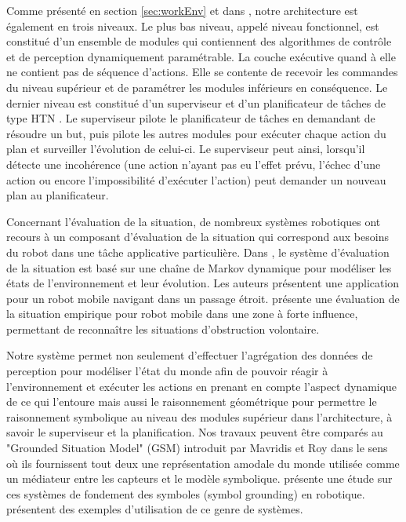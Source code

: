 \documentclass[a4paper,11pt,twoside]{StyleThese}
\begin{document}
Comme présenté en section \ref{sec:workEnv} et dans \cite{Alami1998}, notre architecture est également en trois niveaux. Le plus bas niveau, appelé niveau fonctionnel, est constitué d'un ensemble de modules qui contiennent des algorithmes de contrôle et de perception dynamiquement paramétrable.
La couche exécutive quand à elle ne contient pas de séquence d'actions. Elle se contente de recevoir les commandes du niveau supérieur et de paramétrer les modules inférieurs en conséquence. Le dernier niveau est constitué d'un superviseur \cite{fioreiser2014} et d'un planificateur de tâches de type HTN \cite{Guitton2012}. Le superviseur pilote le planificateur de tâches en demandant de résoudre un but, puis pilote les autres modules pour exécuter chaque action du plan et surveiller l'évolution de celui-ci.
Le superviseur peut ainsi, lorsqu'il détecte une incohérence (une action n'ayant pas eu l'effet prévu, l'échec d'une action ou encore l'impossibilité d'exécuter l'action) peut demander un nouveau plan au planificateur. 


Concernant l'évaluation de la situation, de nombreux systèmes robotiques ont recours à un composant d'évaluation de la situation qui correspond aux besoins du robot dans une tâche applicative particulière. Dans \cite{beck2011}, le système d'évaluation de la situation est basé sur une chaîne de Markov dynamique pour modéliser les états de l'environnement et leur évolution. Les auteurs présentent une application pour un robot mobile navigant dans un passage étroit.
\cite{Kluge01situationassessment} présente une évaluation de la situation empirique pour robot mobile dans une zone à forte influence, permettant de reconnaître les situations d'obstruction volontaire.

Notre système permet non seulement d'effectuer l'agrégation des données de perception pour modéliser l'état du monde afin de pouvoir réagir à l'environnement et exécuter les actions en prenant en compte l'aspect dynamique de ce qui l'entoure mais aussi le raisonnement géométrique pour permettre le raisonnement symbolique au niveau des modules supérieur dans l'architecture, à savoir le superviseur et la planification.
Nos travaux peuvent être comparés au "Grounded Situation Model" (GSM) introduit par Mavridis et Roy \cite{Mavridis2005} dans le sens où ils fournissent tout deux une représentation amodale du monde utilisée comme un médiateur entre les capteurs et le modèle symbolique. \cite{Coradeschi2013} présente une étude sur ces systèmes de fondement des symboles (symbol grounding) en robotique. \cite{Daoutis2009} \cite{Lemaignan2011}
présentent des exemples d'utilisation de ce genre de systèmes.
\end{document}
